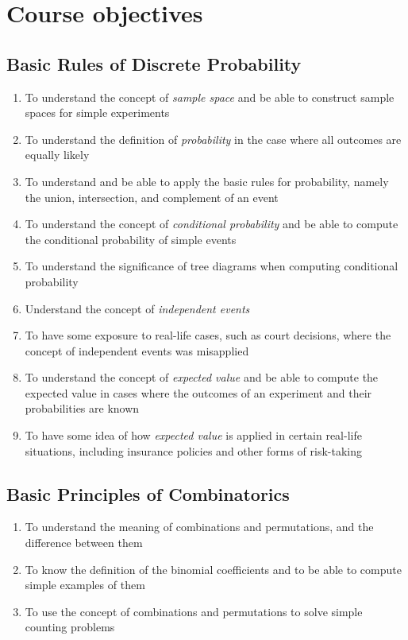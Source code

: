 \documentclass[11pt]{article}
\begin{document}
\section{Course objectives}
\subsection{Basic Rules of Discrete Probability}
\begin{enumerate}
\item To understand the concept of {\em sample space} and be able to construct sample spaces for simple experiments
\item To understand the definition of {\em probability} in the case where all outcomes are equally likely
\item To understand and be able to apply the basic rules for probability,
namely the union, intersection, and complement of an event
\item To understand the concept of {\em conditional probability}
and be able to compute the conditional probability of simple events
\item To understand the significance of tree diagrams
when computing conditional probability
\item Understand the concept of {\em independent events}
\item To have some exposure to real-life cases, such as court decisions,
where the concept of independent events was misapplied
\item To understand the concept of {\em expected value}
and be able to compute the expected value in cases where the
outcomes of an experiment and their probabilities are known
\item To have some idea of how {\em expected value}
is applied in certain real-life situations,
including insurance policies and other forms of risk-taking
\end{enumerate}
\subsection{Basic Principles of Combinatorics}
\begin{enumerate}
\item To understand the meaning of combinations and permutations,
and the difference between them
\item To know the definition of the binomial coefficients
and to be able to compute simple examples of them
\item To use the concept of combinations and permutations
to solve simple counting problems
\end{enumerate}
\end{document}
